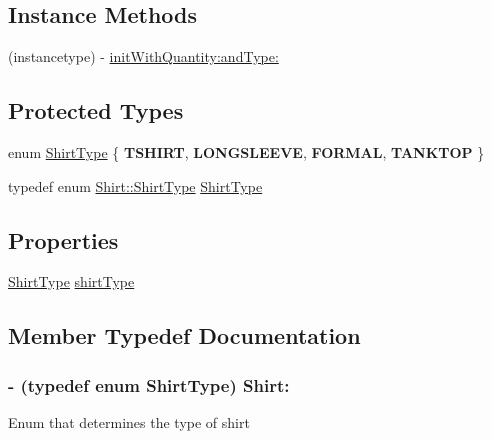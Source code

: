 \subsection*{Instance Methods}
\begin{DoxyCompactItemize}
\item 
(instancetype) -\/ \hyperlink{interface_shirt_a4cfd2e4f76bdc32116ce199018c7435e}{init\-With\-Quantity\-:and\-Type\-:}
\end{DoxyCompactItemize}
\subsection*{Protected Types}
\begin{DoxyCompactItemize}
\item 
enum \hyperlink{interface_shirt_a28c99ecbb0b60c4c402b518cfb60b872}{Shirt\-Type} \{ {\bfseries T\-S\-H\-I\-R\-T}, 
{\bfseries L\-O\-N\-G\-S\-L\-E\-E\-V\-E}, 
{\bfseries F\-O\-R\-M\-A\-L}, 
{\bfseries T\-A\-N\-K\-T\-O\-P}
 \}
\item 
typedef enum \hyperlink{interface_shirt_a28c99ecbb0b60c4c402b518cfb60b872}{Shirt\-::\-Shirt\-Type} \hyperlink{interface_shirt_a25fa1f710b76df3e241894217799dc41}{Shirt\-Type}
\end{DoxyCompactItemize}
\subsection*{Properties}
\begin{DoxyCompactItemize}
\item 
\hyperlink{interface_shirt_a28c99ecbb0b60c4c402b518cfb60b872}{Shirt\-Type} \hyperlink{interface_shirt_a312c9f3c6d1ec26c2138dde13fab581d}{shirt\-Type}
\end{DoxyCompactItemize}


\subsection{Member Typedef Documentation}
\hypertarget{interface_shirt_a25fa1f710b76df3e241894217799dc41}{
\subsubsection[{Shirt\-Type}]{\setlength{\rightskip}{0pt plus 5cm}-\/ (typedef enum {\bf Shirt\-Type})  Shirt\-:\hspace{0.3cm}{\ttfamily [protected]}}}\label{interface_shirt_a25fa1f710b76df3e241894217799dc41}
Enum that determines the type of shirt 

